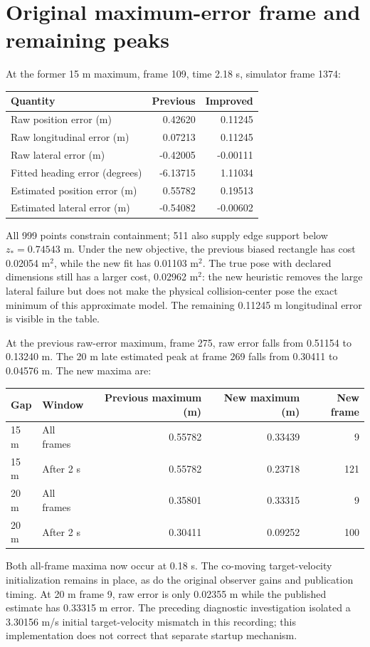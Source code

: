 \documentclass[11pt]{article}
\begin{document}
\section{Original maximum-error frame and remaining peaks}
At the former 15 m maximum, frame 109, time 2.18 s, simulator frame 1374:
\begin{center}\small
\begin{tabular}{@{}lrr@{}}\toprule
Quantity & Previous & Improved \\\midrule
Raw position error (m) & 0.42620 & 0.11245 \\
Raw longitudinal error (m) & 0.07213 & 0.11245 \\
Raw lateral error (m) & -0.42005 & -0.00111 \\
Fitted heading error (degrees) & -6.13715 & 1.11034 \\
Estimated position error (m) & 0.55782 & 0.19513 \\
Estimated lateral error (m) & -0.54082 & -0.00602 \\
\bottomrule\end{tabular}
\end{center}
All 999 points constrain containment; 511 also supply edge support below
$z_*=0.74543$ m. Under the new objective, the previous biased rectangle has
cost 0.02054 m$^2$, while the new fit has 0.01103 m$^2$.
The true pose with declared dimensions still has a larger cost, 0.02962 m$^2$:
the new heuristic removes the large lateral failure but does not make the
physical collision-center pose the exact minimum of this approximate model.
The remaining 0.11245 m longitudinal error is visible in the table.

At the previous raw-error maximum, frame 275, raw error falls from 0.51154
to 0.13240 m. The 20 m late estimated peak at frame 269 falls from 0.30411
to 0.04576 m. The new maxima are:
\begin{center}\small
\begin{tabular}{@{}llrrr@{}}\toprule
Gap & Window & Previous maximum (m) & New maximum (m) & New frame \\\midrule
15 m & All frames & 0.55782 & 0.33439 & 9 \\
15 m & After 2 s & 0.55782 & 0.23718 & 121 \\
20 m & All frames & 0.35801 & 0.33315 & 9 \\
20 m & After 2 s & 0.30411 & 0.09252 & 100 \\
\bottomrule\end{tabular}
\end{center}
Both all-frame maxima now occur at 0.18 s. The co-moving target-velocity
initialization remains in place, as do the original observer gains and
publication timing. At 20 m frame 9, raw error is only 0.02355 m while the
published estimate has 0.33315 m error. The preceding diagnostic investigation
isolated a 3.30156 m/s initial target-velocity mismatch in this recording;
this implementation does not correct that separate startup mechanism.
\end{document}
